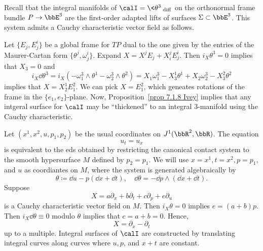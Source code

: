 \begin{example}\label{ex 7.1.10 Ivey}
    Recall tbat the integral manifolds of $\calI=\<\theta^3\>_{\mathrm{diff}}$ on the orthonormal frame bundle $P\to \bbE^3$   are the first-order adapted lifts of surfaces $\Sigma\subset\bbE^3$. This system admits a Cauchy characteristic vector field as follows.

    Let $\{E_j,E^i_j\}$ be a global frame for $TP$ dual to the one given by the entries of the Maurer-Cartan form $\{\theta^j,\omega^i_j\}$. Expand $X=X^jE_j+X^j_i E^i_j$. Then $i_X\theta^3=0$ implies that $X_3=0$ and 
    \[i_X \dd\theta^3=i_X(-\omega^3_1\wedge\theta^1-\omega^3_2\wedge\theta^2)=X_1\omega^3_1-X^1_3\theta^1+X_2\omega^3_2-X^2_3\theta^2\]
    implies that $X=X^1_2 E^2_1$. We can pick $X=E^2_1$, which geneates rotations of the frame in the $\{e_1,e_2\}$-plane. Now, Proposition~\ref{prop 7.1.8 Ivey} implies that any intgeral surface for $\calI$ may be ``thickened'' to an integral $3$-manifold using the Cauchy characteristic.
\end{example}


\begin{example}
    Let $(x^1,x^2,u,p_1,p_2)$ be the usual coordinates on $J^1(\bbR^2,\bbR)$. The equation 
    \[u_t=u_x\] 
    is equivalent to the \gls{eds} obtained by restricting the canonical contact system to the smooth hypersurface $M$ defined by $p_2=p_1$. We will use $x=x^1,t=x^2,p=p_1$, and $u$ as coordiantes on $M$, where the system is generated algebraically by 
    \[\theta\coloneqq \dd u-p(\dd x+\dd t),\quad \dd\theta=-\dd p\wedge(\dd x+\dd t).\]
    Suppose 
    \[X=a\partial_x+b\partial_t+c\partial_p+e\partial_u\]
    is a Cauchy characteristic vector field on $M$. Then $i_X\theta=0$ implies $e=(a+b)p$. Then $i_X\dd \theta\equiv 0$ modulo $\theta$ implies that $c=a+b=0$. Hence,
    \[X=\partial_x-\partial_t\]
    up to a multiple. Integral surfaces of $\calI$ are constructed by translating integral curves along curves where $u,p$, and $x+t$ are constant.
\end{example}

